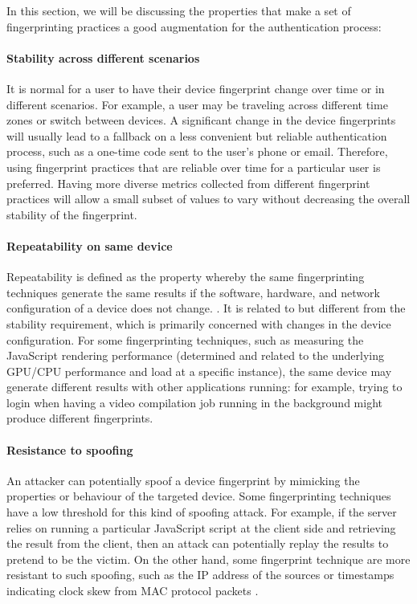 \documentclass{acm_proc_article-sp}
\begin{document}
In this section, we will be discussing the properties that make a set of fingerprinting practices a good augmentation for the authentication process:

\paragraph{Stability across different scenarios}
It is normal for a user to have their device fingerprint change over time or in different scenarios. For example,  a user may be traveling across different time zones or switch between devices. 
A significant change in the device fingerprints will usually lead to a fallback on a less convenient but reliable authentication process, such as a one-time code sent to the user's phone or email. Therefore, using fingerprint practices that are reliable over time for a particular user is preferred. Having more diverse metrics collected from different fingerprint practices will allow a small subset of values to vary without decreasing the overall stability of the fingerprint.

\paragraph{Repeatability on same device}
Repeatability is defined as the property whereby the same fingerprinting techniques generate the same results if the software, hardware, and network configuration of a device does not change. \cite{alca:dev}. It is related to but different from the stability requirement, which is primarily concerned  with changes in the device configuration.
For some  fingerprinting techniques, such as measuring the JavaScript rendering performance (determined and related to the underlying GPU/CPU performance and load at a specific instance), the same device may generate different results with other applications running: for example, trying to login when having a video compilation job running in the background might produce different fingerprints.

\paragraph {Resistance to spoofing}
An attacker can potentially spoof a device fingerprint by mimicking the properties or behaviour of the targeted device. Some fingerprinting techniques  have a low threshold for this kind of spoofing attack. For example, if the server relies on running a particular JavaScript script at the client side and retrieving the result from the client, then an attack can potentially replay the results to pretend to be the victim.
On the other hand, some fingerprint technique are more resistant to such spoofing, such as the IP address of the sources\cite{beverly:ip} or timestamps indicating clock skew from MAC protocol packets \cite{ara:wire}.
\end{document}
